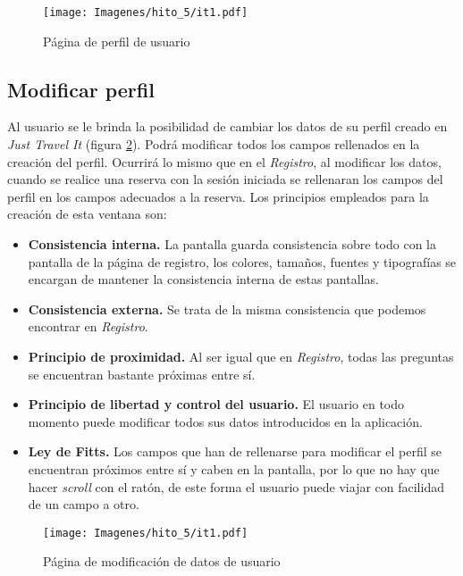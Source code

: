 \begin{figure}[H]
    \centering
    \texttt{[image: Imagenes/hito\_5/it1.pdf]}
    \caption{Página de perfil de usuario}
    \label{fig:it1_perfil}
\end{figure}

\subsection*{Modificar perfil}

Al usuario se le brinda la posibilidad de cambiar los datos de su perfil creado en \textit{Just Travel It} (figura \ref{fig:it1_mod_datos}). Podrá
modificar todos los campos rellenados en la creación del perfil. Ocurrirá lo mismo que en el \textit{Registro},
al modificar los datos, cuando se realice una reserva con la sesión iniciada se rellenaran los campos del perfil
en los campos adecuados a la reserva. Los principios empleados para la creación de esta ventana son:

\begin{itemize}
    \item \textbf{Consistencia interna.} La pantalla guarda consistencia sobre todo con la pantalla de la página de registro,
        los colores, tamaños, fuentes y tipografías se encargan de mantener la consistencia interna de estas pantallas.
    \item \textbf{Consistencia externa.} Se trata de la misma consistencia que podemos encontrar en \textit{Registro}.
    \item \textbf{Principio de proximidad.} Al ser igual que en \textit{Registro}, todas las preguntas se encuentran
        bastante próximas entre sí.
    \item \textbf{Principio de libertad y control del usuario.} El usuario en todo momento puede modificar todos
        sus datos introducidos en la aplicación.
    \item \textbf{Ley de Fitts.} Los campos que han de rellenarse para modificar el perfil se encuentran próximos
        entre sí y caben en la pantalla, por lo que no hay que hacer \textit{scroll} con el ratón, de este forma
        el usuario puede viajar con facilidad de un campo a otro.
\end{itemize}

\begin{figure}[H]
    \centering
    \texttt{[image: Imagenes/hito\_5/it1.pdf]}
    \caption{Página de modificación de datos de usuario}
    \label{fig:it1_mod_datos}
\end{figure}


